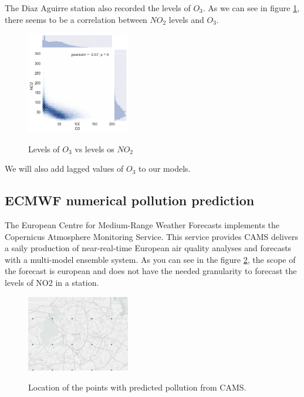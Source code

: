 \documentclass[a4paper,twocolumn,5p]{elsarticle}
\begin{document}
The Diaz Aguirre station also recorded the levels of $O_3$. As we can see in figure \ref{figure:no2vso3},
there seems to be a correlation between $NO_2$ levels and $O_3$.

\begin{figure}
  \centering
  \includegraphics[width=0.4\textwidth]{no2vso3}
  \label{figure:no2vso3}
  \caption{Levels of $O_3$ vs levels os $NO_2$}
\end{figure}

We will also add lagged values of $O_3$ to our models.

\subsection{ECMWF numerical pollution prediction}
\label{sec:ecmwf-numer-poll}

The European Centre for Medium-Range Weather Forecasts implements the Copernicus Atmosphere Monitoring Service.
This service provides CAMS delivers a saily production of near-real-time European air quality analyses and forecasts 
with a multi-model ensemble system. 
As you can see in the figure \ref{figure:camspoints}, the scope of the forecast is european and does not have the needed granularity to forecast 
the levels of NO2 in a station.

\begin{figure}
  \centering
  \includegraphics[width=0.4\textwidth]{camspoints}
  \label{figure:camspoints}
  \caption{Location of the points with predicted pollution from CAMS.}
\end{figure}
\end{document}
